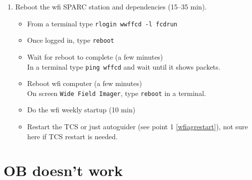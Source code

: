 \documentclass[11pt,fleqn]{book}
\def\procref#1{Procedure~\ref{proc:#1}, p.~\pageref{proc:#1}}
\def\figref#1{Fig.~\ref{fig:#1}, p.~\pageref{fig:#1}}
\begin{document}
\begin{enumerate}
\begin{enumerate}
       \item Deactivate the connection between \gls{feros} and TCS
           \begin{itemize}
                \item On the \gls{feros} screen (\figref{saladecontrol}), locate the \gls{feros} control panel (\figref{feroscon})
                \item From menu select \texttt{Telescope $\rightarrow$ IGNORE}
           \end{itemize}
       \item Perform a full restart the \gls{tcs} including VME reboot (\procref{startup})
       \item Reactivate the connection between \gls{feros} and TCS
           \begin{itemize}
                \item On the \gls{feros} screen (\figref{saladecontrol}), locate the \gls{feros} control panel (\figref{feroscon})
                \item From menu select \texttt{Telescope $\rightarrow$ ENABLE}
           \end{itemize}
    \end{enumerate}
    \item Reboot the \gls{wfi} SPARC station and dependencies (15--35 min).
    \begin{itemize}
        \item From a terminal type \texttt{rlogin wwffcd -l fcdrun}
        \item Once logged in, type \texttt{reboot}
        \item Wait for reboot to complete (a few minutes)\\
              In a terminal type \texttt{ping wffcd} and wait until it shows packets.
        \item Reboot \gls{wfi} computer (a few minutes)\\
              On screen \texttt{Wide Field Imager}, type \texttt{reboot} in a terminal.
        \item Do the \gls{wfi} weekly startup (10 min)
        \item Restart the TCS or just autoguider (see point 1 \ref{wfiagrestart}), not sure here if TCS restart is needed.
    \end{itemize}
\end{enumerate}

\section{OB doesn't work}
\end{document}
